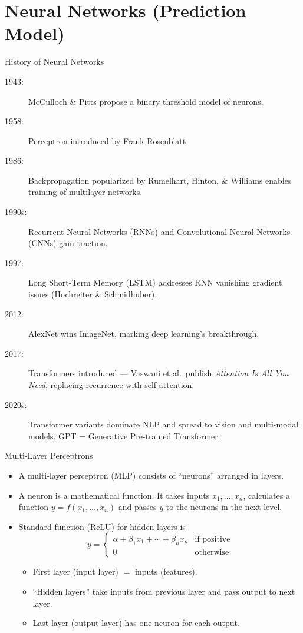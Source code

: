 \documentclass[10pt]{beamer}
\begin{document}
\section{Neural Networks (Prediction Model)}

\begin{frame}{History of Neural Networks}
    \begin{description}
      \item[1943:] McCulloch \& Pitts propose a binary threshold model of neurons.
      \item[1958:] Perceptron introduced by Frank Rosenblatt 
      \item[1986:] Backpropagation popularized by Rumelhart, Hinton, \& Williams enables training of multilayer networks.
      \item[1990s:] Recurrent Neural Networks (RNNs) and Convolutional Neural Networks (CNNs) gain traction.
      \item[1997:] Long Short-Term Memory (LSTM) addresses RNN vanishing gradient issues (Hochreiter \& Schmidhuber).
      \item[2012:] AlexNet wins ImageNet, marking deep learning's breakthrough.
      \item[2017:] \alert{Transformers introduced} --- Vaswani et al.\ publish \emph{Attention Is All You Need}, replacing recurrence with self-attention.
      \item[2020s:] Transformer variants dominate NLP and spread to vision and multi-modal models. GPT = Generative Pre-trained Transformer.
   \end{description}
\end{frame}

\begin{frame}{Multi-Layer Perceptrons}
    \begin{itemize}
        \item A multi-layer perceptron (MLP) consists of ``neurons'' arranged in layers.
        \item A neuron is a mathematical function. It takes inputs $x_1, \ldots, x_n$, calculates a function $y=f(x_1, \ldots, x_n)$ and passes $y$ to the neurons in the next level.
        \item Standard function (ReLU) for hidden layers is 
        $$y = \begin{cases}\alpha+\beta_1x_1 + \cdots + \beta_nx_n & \text{if positive} \\ 0 & \text{otherwise}\end{cases}$$
        \begin{itemize}
            \item First layer (input layer) $=$ inputs (features).
            \item ``Hidden layers'' take inputs from previous layer and pass output to next layer.
            \item Last layer (output layer) has one neuron for each output.
        \end{itemize}
    \end{itemize}
    \end{frame}
    
\end{document}
